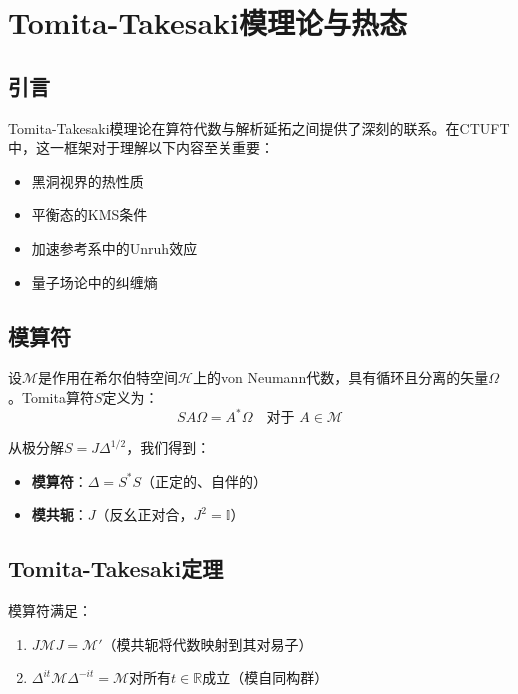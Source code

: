 \section{Tomita-Takesaki模理论与热态}
\label{sec:tomita_takesaki}

\subsection{引言}

Tomita-Takesaki模理论\cite{takesaki1970}在算符代数与解析延拓之间提供了深刻的联系。在CTUFT中，这一框架对于理解以下内容至关重要：
\begin{itemize}
    \item 黑洞视界的热性质
    \item 平衡态的KMS条件
    \item 加速参考系中的Unruh效应
    \item 量子场论中的纠缠熵
\end{itemize}

\subsection{模算符}

\begin{definition}[Tomita算符]
设$\mathcal{M}$是作用在希尔伯特空间$\mathcal{H}$上的von Neumann代数，具有循环且分离的矢量$\Omega$。Tomita算符$S$定义为：
\begin{equation}
    S A\Omega = A^*\Omega \quad \text{对于 } A \in \mathcal{M}
\end{equation}
\end{definition}

\begin{definition}[模算符]
从极分解$S = J\Delta^{1/2}$，我们得到：
\begin{itemize}
    \item \textbf{模算符}：$\Delta = S^* S$（正定的、自伴的）
    \item \textbf{模共轭}：$J$（反幺正对合，$J^2 = \mathbb{I}$）
\end{itemize}
\end{definition}

\subsection{Tomita-Takesaki定理}

\begin{theorem}
模算符满足：
\begin{enumerate}
    \item $J\mathcal{M}J = \mathcal{M}'$（模共轭将代数映射到其对易子）
    \item $\Delta^{it}\mathcal{M}\Delta^{-it} = \mathcal{M}$对所有$t \in \mathbb{R}$成立（模自同构群）
\end{enumerate}
\end{theorem}

